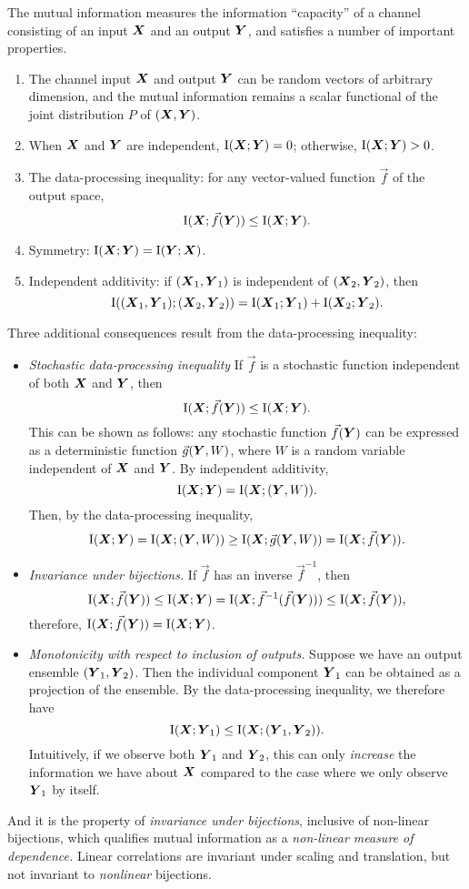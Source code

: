 \documentclass[12pt]{article}
\begin{document}
The mutual information measures the information ``capacity'' of a
channel consisting of an input $\boldsymbol{X}$ and an output $\boldsymbol{Y}$, and
satisfies a number of important properties.
\begin{enumerate}
\item The channel input $\boldsymbol{X}$ and output $\boldsymbol{Y}$ can be random vectors of arbitrary dimension, and the mutual information remains a scalar functional of the joint distribution $P$ of $(\boldsymbol{X}, \boldsymbol{Y})$.
\item When $\boldsymbol{X}$ and $\boldsymbol{Y}$ are independent, $\text{I}(\boldsymbol{X}; \boldsymbol{Y}) = 0$; otherwise, $\text{I}(\boldsymbol{X}; \boldsymbol{Y}) > 0$.
\item The data-processing inequality: for any vector-valued function $\vec{f}$ of the output space,
\[
\text{I}(\boldsymbol{X}; \vec{f}(\boldsymbol{Y})) \leq \text{I}(\boldsymbol{X}; \boldsymbol{Y}).
\]
\item Symmetry: $\text{I}(\boldsymbol{X}; \boldsymbol{Y}) = \text{I}(\boldsymbol{Y}; \boldsymbol{X})$.
\item Independent additivity: if $(\boldsymbol{X}_1,\boldsymbol{Y}_1)$ is independent of $(\boldsymbol{X}_2, \boldsymbol{Y}_2)$, then
\[
\text{I}((\boldsymbol{X}_1,\boldsymbol{Y}_1); (\boldsymbol{X}_2, \boldsymbol{Y}_2)) = \text{I}(\boldsymbol{X}_1; \boldsymbol{Y}_1) + \text{I}(\boldsymbol{X}_2; \boldsymbol{Y}_2).
\]
\end{enumerate}
Three additional consequences result from the data-processing inequality:
\begin{itemize}
\item \emph{Stochastic data-processing inequality}  If $\vec{f}$ is a stochastic function independent of both $\boldsymbol{X}$ and $\boldsymbol{Y}$, then
\[
\text{I}(\boldsymbol{X}; \vec{f}(\boldsymbol{Y})) \leq \text{I}(\boldsymbol{X}; \boldsymbol{Y}).
\]
This can be shown as follows: any stochastic function $\vec{f}(\boldsymbol{Y})$
can be expressed as a deterministic function $\vec{g}(\boldsymbol{Y}, W)$, where
$W$ is a random variable independent of $\boldsymbol{X}$ and $\boldsymbol{Y}$.
By independent additivity,
\[
\text{I}(\boldsymbol{X}; \boldsymbol{Y}) = \text{I}(\boldsymbol{X}; (\boldsymbol{Y}, W)).
\]
Then, by the data-processing inequality,
\[
\text{I}(\boldsymbol{X}; \boldsymbol{Y}) = \text{I}(\boldsymbol{X}; (\boldsymbol{Y}, W)) \geq \text{I}(\boldsymbol{X}; \vec{g}(\boldsymbol{Y}, W)) = \text{I}(\boldsymbol{X}; \vec{f}(\boldsymbol{Y})).
\]
\item \emph{Invariance under bijections.} If $\vec{f}$ has an inverse $\vec{f}^{-1}$, then 
\[
\text{I}(\boldsymbol{X}; \vec{f}(\boldsymbol{Y})) \leq \text{I}(\boldsymbol{X}; \boldsymbol{Y}) = \text{I}(\boldsymbol{X}; \vec{f}^{-1}(\vec{f}(\boldsymbol{Y}))) \leq \text{I}(\boldsymbol{X}; \vec{f}(\boldsymbol{Y})),
\]
therefore, $\text{I}(\boldsymbol{X}; \vec{f}(\boldsymbol{Y})) = \text{I}(\boldsymbol{X}; \boldsymbol{Y})$.
\item \emph{Monotonicity with respect to inclusion of outputs.}  Suppose we have an output ensemble $(\boldsymbol{Y}_1,\boldsymbol{Y}_2)$.  Then the individual component $\boldsymbol{Y}_1$ can be obtained as a projection of the ensemble.  By the data-processing inequality, we therefore have
\[
\text{I}(\boldsymbol{X}; \boldsymbol{Y}_1) \leq \text{I}(\boldsymbol{X}; (\boldsymbol{Y}_1, \boldsymbol{Y}_2)).
\]
Intuitively, if we observe both $\boldsymbol{Y}_1$ and $\boldsymbol{Y}_2$, this can
only \emph{increase} the information we have about $\boldsymbol{X}$ compared to
the case where we only observe $\boldsymbol{Y}_1$ by itself.
\end{itemize}
And it is the property of \emph{invariance under bijections},
inclusive of non-linear bijections, which qualifies mutual information
as a \emph{non-linear measure of dependence.}  Linear correlations are
invariant under scaling and translation, but not invariant
to \emph{nonlinear} bijections.
\end{document}
